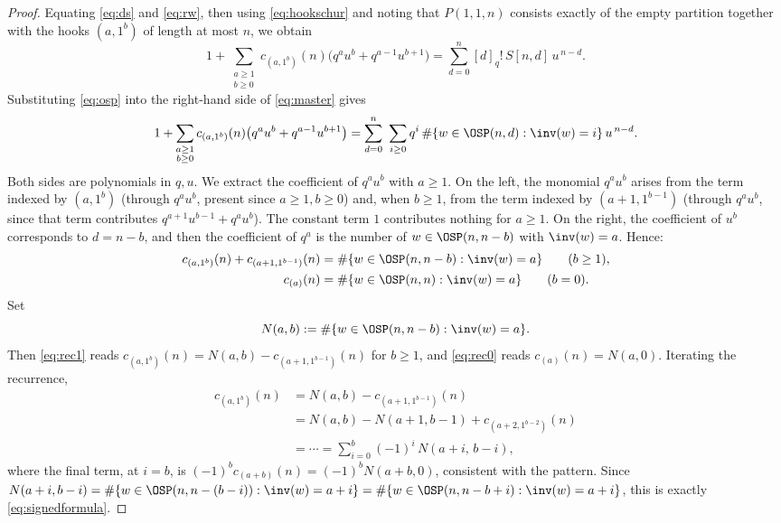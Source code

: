 \begin{proof}
Equating \eqref{eq:ds} and \eqref{eq:rw}, then using \eqref{eq:hookschur} and noting that
$P(1,1,n)$ consists exactly of the empty partition together with the hooks $(a,1^b)$ of
length at most $n$, we obtain
\begin{equation}\label{eq:master}
1+\sum_{\substack{a\ge1\\ b\ge0}}c_{(a,1^b)}(n)\bigl(q^a u^b+q^{a-1}u^{b+1}\bigr)
=\sum_{d=0}^{n}[d]_q!\,S[n,d]\,u^{\,n-d}.
\end{equation}
Substituting \eqref{eq:osp} into the right-hand side of \eqref{eq:master} gives
\begin{equation}\label{eq:master2}
1+\sum_{\substack{a\ge1\\ b\ge0}}c_{(a,1^b)}(n)\bigl(q^a u^b+q^{a-1}u^{b+1}\bigr)
=\sum_{d=0}^{n}\ \sum_{i\ge0} q^{i}\,\#\{w\in\OSP(n,d):\inv(w)=i\}\,u^{\,n-d}.
\end{equation}
Both sides are polynomials in $q,u$. We extract the coefficient of $q^a u^b$ with $a\ge1$.
On the left, the monomial $q^a u^b$ arises from the term indexed by $(a,1^b)$ (through
$q^a u^b$, present since $a\ge1,b\ge0$) and, when $b\ge1$, from the term indexed by
$(a+1,1^{b-1})$ (through $q^{a}u^{b}$, since that term contributes
$q^{a+1}u^{b-1}+q^{a}u^{b}$). The constant term $1$ contributes nothing for $a\ge1$. On the
right, the coefficient of $u^b$ corresponds to $d=n-b$, and then the coefficient of $q^a$
is the number of $w\in\OSP(n,n-b)$ with $\inv(w)=a$. Hence:
\begin{align}
c_{(a,1^b)}(n)+c_{(a+1,1^{b-1})}(n)&=\#\{w\in\OSP(n,n-b):\inv(w)=a\}\qquad(b\ge1),
\label{eq:rec1}\\
c_{(a)}(n)&=\#\{w\in\OSP(n,n):\inv(w)=a\}\qquad(b=0).
\label{eq:rec0}
\end{align}
Set
\[
N(a,b):=\#\{w\in\OSP(n,n-b):\inv(w)=a\}.
\]
Then \eqref{eq:rec1} reads $c_{(a,1^b)}(n)=N(a,b)-c_{(a+1,1^{b-1})}(n)$ for $b\ge1$, and
\eqref{eq:rec0} reads $c_{(a)}(n)=N(a,0)$. Iterating the recurrence,
\begin{align*}
c_{(a,1^b)}(n)
&=N(a,b)-c_{(a+1,1^{b-1})}(n)\\
&=N(a,b)-N(a+1,b-1)+c_{(a+2,1^{b-2})}(n)\\
&=\cdots=\sum_{i=0}^{b}(-1)^i\,N(a+i,\,b-i),
\end{align*}
where the final term, at $i=b$, is $(-1)^b c_{(a+b)}(n)=(-1)^b N(a+b,0)$, consistent with
the pattern. Since $N(a+i,b-i)=\#\{w\in\OSP(n,n-(b-i)):\inv(w)=a+i\}
=\#\{w\in\OSP(n,n-b+i):\inv(w)=a+i\}$, this is exactly \eqref{eq:signedformula}.
\end{proof}

